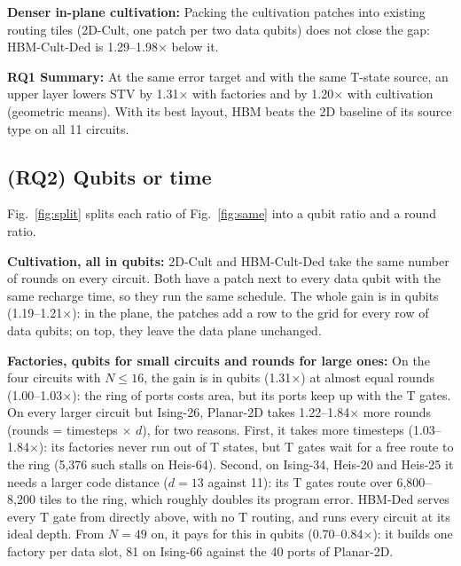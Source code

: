 \textbf{Denser in-plane cultivation:} Packing the cultivation patches into existing routing
tiles (2D-Cult\textonehalf, one patch per two data qubits) does not close the gap: HBM-Cult-Ded
is 1.29--1.98$\times$ below it.

\begin{rqsummary}
\textbf{RQ1 Summary:} At the same error target and with the same T-state source, an upper
layer lowers STV by 1.31$\times$ with factories and by 1.20$\times$ with cultivation
(geometric means). With its best layout, HBM beats the 2D baseline of its source type on all
11 circuits.
\end{rqsummary}


\subsection{(RQ2) Qubits or time}

Fig.~\ref{fig:split} splits each ratio of Fig.~\ref{fig:same} into a qubit ratio and a round
ratio.

\textbf{Cultivation, all in qubits:} 2D-Cult and HBM-Cult-Ded take the same number of rounds
on every circuit. Both have a patch next to every data qubit with the same recharge time, so
they run the same schedule. The whole gain is in qubits (1.19--1.21$\times$): in the plane,
the patches add a row to the grid for every row of data qubits; on top, they leave the data
plane unchanged.

\textbf{Factories, qubits for small circuits and rounds for large ones:} On the four
circuits with $N \le 16$, the gain is in qubits (1.31$\times$) at almost equal rounds
(1.00--1.03$\times$): the ring of ports costs area, but its ports keep up with the T gates.
On every larger circuit but Ising-26, Planar-2D takes 1.22--1.84$\times$ more rounds
(rounds = timesteps $\times$ $d$), for two reasons. First, it takes more timesteps
(1.03--1.84$\times$): its factories never run out of T states, but T gates wait for a free
route to the ring (5,376 such stalls on Heis-64). Second, on Ising-34, Heis-20 and Heis-25
it needs a larger code distance ($d = 13$ against 11): its T gates route over 6,800--8,200
tiles to the ring, which roughly doubles its program error. HBM-Ded serves every T gate
from directly above, with no T routing, and runs every circuit at its ideal depth. From $N = 49$ on, it pays for this
in qubits (0.70--0.84$\times$): it builds one factory per data slot, 81 on Ising-66 against
the 40 ports of Planar-2D.

